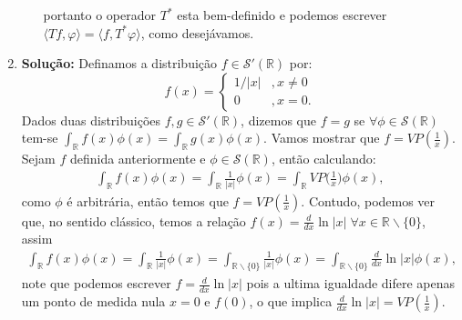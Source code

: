 \documentclass{article}
\begin{document}
\begin{enumerate}
\begin{enumerate}
$$				$$
				portanto o operador $T^{*}$ esta bem-definido e podemos escrever $\langle Tf, \varphi \rangle = \langle f, T^{*}\varphi \rangle $, como desejávamos.
			\end{enumerate}		
		\item \textbf{Solução:} Definamos a distribuição $f \in \mathcal{S}'(\mathbb{R})$ por:
		$$
		f(x) = 
		\left\{
			\begin{array}{cc}
			1/|x| & , x\neq 0 \\
			0 & , x =0.
			\end{array}		
		\right.
		$$
		Dados duas distribuições $f, g \in \mathcal{S}'(\mathbb{R})$, dizemos que $f = g$ se $\forall \phi \in \mathcal{S}(\mathbb{R})$ tem-se $\int_{\mathbb{R}}f(x)\phi(x) = \int_{\mathbb{R}}g(x)\phi(x)$. Vamos mostrar que $f = VP(\frac{1}{x})$. Sejam $f$ definida anteriormente e $\phi \in \mathcal{S}(\mathbb{R})$, então calculando:
		$$
		\begin{aligned}
		\int_{\mathbb{R}} f(x)\phi(x) = \int_{\mathbb{R}} \frac{1}{|x|}\phi(x) = \int_{\mathbb{R}} VP\Big( \frac{1}{x} \Big)\phi(x), 
		\end{aligned}
		$$
		como $\phi$ é arbitrária, então temos que $f = VP(\frac{1}{x})$. Contudo, podemos ver que, no sentido clássico, temos a relação $f(x) = \frac{d}{dx}\ln|x| \; \forall x \in \mathbb{R}\backslash\{0\}$, assim 
		$$
		\begin{aligned}
			\int_{\mathbb{R}} f(x)\phi(x) = \int_{\mathbb{R}} \frac{1}{|x|}\phi(x) = \int_{\mathbb{R}\backslash\{0\}} \frac{1}{|x|}\phi(x) = \int_{\mathbb{R}\backslash\{0\}} \frac{d}{dx}\ln|x|\phi(x) , 
		\end{aligned}
		$$
		note que podemos escrever $f = \frac{d}{dx}\ln|x|$ pois a ultima igualdade difere apenas um ponto de medida nula $x=0$ e $f(0)$, o que implica $\frac{d}{dx}\ln|x| = VP(\frac{1}{x})$.
		
	\end{enumerate}
	
	
\end{document}
